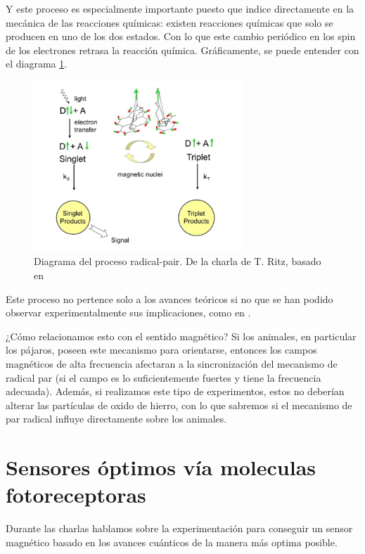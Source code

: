 \documentclass[1p]{elsarticle}
\begin{document}
Y este proceso es especialmente importante puesto que indice directamente en la mecánica de las reacciones químicas: existen reacciones químicas que solo se producen en uno de los dos estados. Con lo que este cambio periódico en los spin de los electrones retrasa la reacción química. Gráficamente, se puede entender con el diagrama \ref{diagrama}.


\begin{figure}
	\centering
	\includegraphics[width=0.7\textwidth]{diagrama}
	\caption{Diagrama del proceso radical-pair. De la charla de T. Ritz, basado en \cite{schulten1978semiclassical}}
	\label{diagrama}
\end{figure}


Este proceso no pertence solo a los avances teóricos si no que se han podido observar experimentalmente sus implicaciones, como en \cite{maeda2008chemical}.

¿Cómo relacionamos esto con el sentido magnético? Si los animales, en particular los pájaros, poseen este mecanismo para orientarse, entonces los campos magnéticos de alta frecuencia afectaran a la sincronización del mecanismo de radical par (si el campo es lo suficientemente fuertes y tiene la frecuencia adecuada). 
Además, si realizamos este tipo de experimentos, estos no deberían alterar las partículas de oxido de hierro, con lo que sabremos si el mecanismo de par radical influye directamente sobre los animales. 


\section{Sensores óptimos vía moleculas fotoreceptoras}
Durante las charlas hablamos sobre la experimentación para conseguir un sensor magnético basado en los avances cuánticos de la manera más optima posible.  
\end{document}
